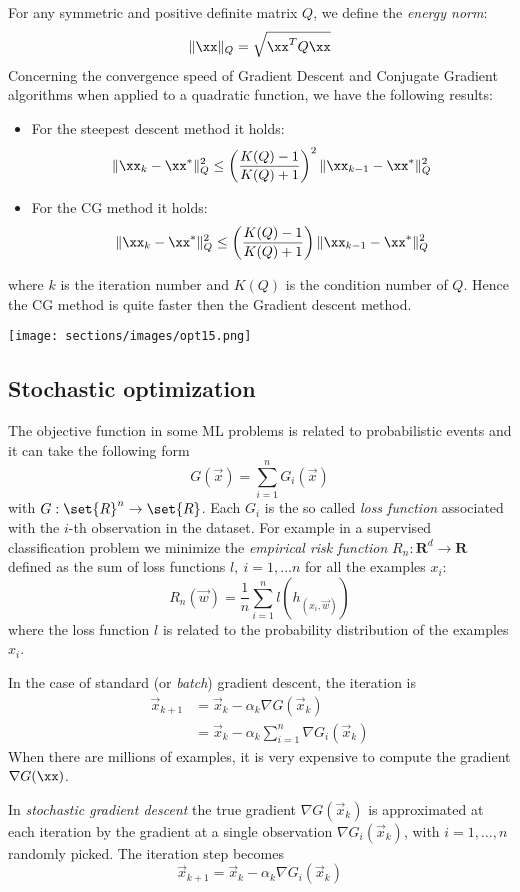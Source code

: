 For any symmetric and positive definite matrix $Q$, we define the \textit{energy norm}:
$$\| \xx \|_Q=\sqrt{\xx^T Q \xx}$$ 
Concerning the convergence speed of Gradient Descent and Conjugate Gradient algorithms when applied to a quadratic function, we have the following results:
\begin{itemize}
\item For the steepest descent method it holds:
    $$ \| \xx_k - \xx^* \|_Q^2 \leq \left(\frac{K(Q)-1}{K(Q)+1}\right)^2 \| \xx_{k-1} - \xx^*\|_Q^2$$
    \item For the CG method it holds:
    $$ \| \xx_k - \xx^* \|_Q^2 \leq \left(\frac{K(Q)-1}{K(Q)+1}\right) \| \xx_{k-1} - \xx^*\|_Q^2 $$
\end{itemize}
where $k$ is the iteration number and $K(Q)$ is the condition number of $Q$.
Hence the CG method is quite faster then the Gradient descent method.

\texttt{[image: sections/images/opt15.png]}

\subsection{Stochastic optimization}
The objective function in some ML problems is related to probabilistic events and it can take the following form
$$ G(\vec{x}) = \sum_{i = 1}^{n}{G_i(\vec{x})} $$
with $G: \set{R}^n \rightarrow \set{R}$. Each $G_i$ is the so called \textit{loss function} associated with the $i$-th observation in the dataset.
For example in a supervised classification problem we minimize the \textit{empirical risk function} $R_n:\mathbf{R}^d \longrightarrow \mathbf{R}$ defined as the sum of loss functions $l, \ i=1, \ldots n$ for all the examples $x_i$:
$$R_n(\vec{w})=\frac{1}{n} \sum_{i=1}^n l(h_(x_i,\vec{w}))$$
where the loss function $l$ is related to the probability distribution of the examples $x_i$.


In the case of standard (or \textit{batch}) gradient descent, the iteration is
$$
    \begin{aligned}
        \vec{x}_{k+1} &= \vec{x}_k - \alpha_k\nabla{G}(\vec{x}_k)\\
        &= \vec{x}_k - \alpha_k\sum_{i=1}^{n}{\nabla{G_i}(\vec{x}_k)}
    \end{aligned}
$$
When there are millions of examples, it is very expensive to compute the gradient $\nabla G(\xx)$.

In \textit{stochastic gradient descent} the true gradient $\nabla{G}(\vec{x}_k)$ is approximated at each iteration by the gradient at a single observation $\nabla{G_i}(\vec{x}_k)$, with $i = 1, \hdots, n$ randomly picked. The iteration step becomes
$$ \vec{x}_{k+1} = \vec{x}_k - \alpha_k\nabla{G_i}(\vec{x}_k) $$

